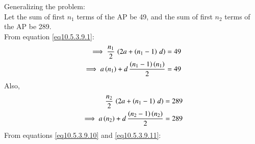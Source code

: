 \documentclass[journal,12pt,twocolumn]{IEEEtran}
\theoremstyle{remark}
\begin{document}
Generalizing the problem:\\
Let the sum of first $n_1$ terms of the AP be 49, and the sum of first $n_2$ terms of the AP be 289.\\
From equation \ref{eq10.5.3.9.1}:
\begin{align}
\implies \frac{n_1}{2}\,\left(2a+\left(n_1-1\right)\,d\right)&=49\\
\implies a\left(n_1\right)+ d\,\frac{\left(n_1-1\right)\left(n_1\right)}{2}&=49\label{eq10.5.3.9.10}
\end{align}
Also,
\begin{align}
\frac{n_2}{2}\,\left(2a+\left(n_1-1\right)\,d\right)&=289\\
\implies a\left(n_2\right)+ d\,\frac{\left(n_2-1\right)\left(n_2\right)}{2}&=289\label{eq10.5.3.9.11}
\end{align}
From  equations \ref{eq10.5.3.9.10} and \ref{eq10.5.3.9.11}:
\end{document}
